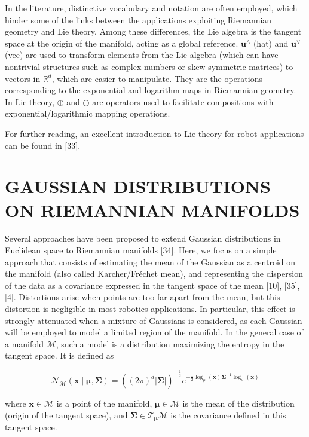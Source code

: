 \documentclass[10pt]{article}
\begin{document}
In the literature, distinctive vocabulary and notation are often employed, which hinder some of the links between the applications exploiting Riemannian geometry and Lie theory. Among these differences, the Lie algebra is the tangent space at the origin of the manifold, acting as a global reference. $\boldsymbol{u}^{\wedge}$ (hat) and $\boldsymbol{u}^{\vee}$ (vee) are used to transform elements from the Lie algebra (which can have nontrivial structures such as complex numbers or skew-symmetric matrices) to vectors in $\mathbb{R}^{d}$, which are easier to manipulate. They are the operations corresponding to the exponential and logarithm maps in Riemannian geometry. In Lie theory, $\oplus$ and $\ominus$ are operators used to facilitate compositions with exponential/logarithmic mapping operations.

For further reading, an excellent introduction to Lie theory for robot applications can be found in [33].

\section{GAUSSIAN DISTRIBUTIONS ON RIEMANNIAN MANIFOLDS}
Several approaches have been proposed to extend Gaussian distributions in Euclidean space to Riemannian manifolds [34]. Here, we focus on a simple approach that consists of estimating the mean of the Gaussian as a centroid on the manifold (also called Karcher/Fréchet mean), and representing the dispersion of the data as a covariance expressed in the tangent space of the mean [10], [35], [4]. Distortions arise when points are too far apart from the mean, but this distortion is negligible in most robotics applications. In particular, this effect is strongly attenuated when a mixture of Gaussians is considered, as each Gaussian will be employed to model a limited region of the manifold. In the general case of a manifold $\mathcal{M}$, such a model is a distribution maximizing the entropy in the tangent space. It is defined as

$$
\mathcal{N}_{\mathcal{M}}(\boldsymbol{x} \mid \boldsymbol{\mu}, \boldsymbol{\Sigma})=\left((2 \pi)^{d}|\boldsymbol{\Sigma}|\right)^{-\frac{1}{2}} e^{-\frac{1}{2} \log _{\mu}(\boldsymbol{x}) \boldsymbol{\Sigma}^{-1} \log _{\mu}(\boldsymbol{x})}
$$

where $\boldsymbol{x} \in \mathcal{M}$ is a point of the manifold, $\boldsymbol{\mu} \in \mathcal{M}$ is the mean of the distribution (origin of the tangent space), and $\boldsymbol{\Sigma} \in \mathcal{T}_{\boldsymbol{\mu}} \mathcal{M}$ is the covariance defined in this tangent space.
\end{document}
